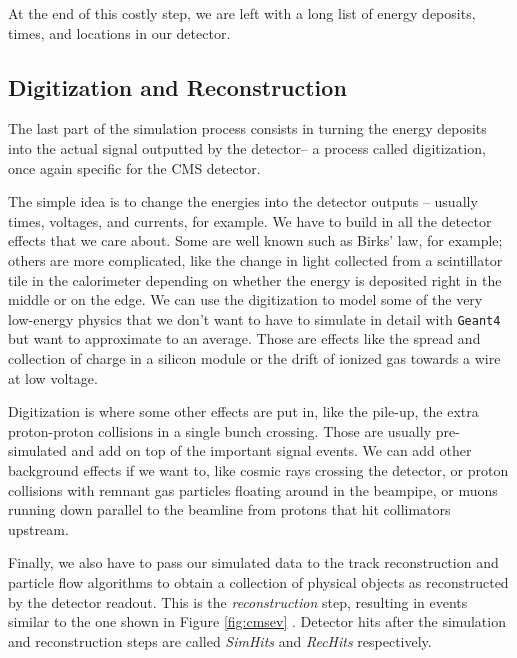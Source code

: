 At the end of this costly step, we are left with a long list of energy deposits, times, and locations in our detector. 

\subsection{Digitization and Reconstruction} 

The last part of the simulation process consists in turning the energy deposits into the actual signal outputted by the detector-- a process called digitization, once again specific for the CMS detector.

The simple idea is to change the energies into the detector outputs – usually times, voltages, and currents, for example. We have to build in all the detector effects that we care about. Some are well known such as Birks’ law, for example; others are more complicated, like the change in light collected from a scintillator tile in the calorimeter depending on whether the energy is deposited right in the middle or on the edge. We can use the digitization to model some of the very low-energy physics that we don’t want to have to simulate in detail with \texttt{Geant4} but want to approximate to an average. Those are effects like the spread and collection of charge in a silicon module or the drift of ionized gas towards a wire at low voltage.

Digitization is where some other effects are put in, like the pile-up, the extra proton-proton collisions in a single bunch crossing. Those are usually pre-simulated and add on top of the important signal events. We can add other background effects if we want to, like cosmic rays crossing the detector, or proton collisions with remnant gas particles floating around in the beampipe, or muons running down parallel to the beamline from protons that hit collimators upstream. 

Finally, we also have to pass our simulated data to the track reconstruction and particle flow algorithms to obtain a collection of physical objects as reconstructed by the detector readout. This is the \emph{reconstruction} step, resulting in events similar to the one shown in Figure \ref{fig:cmsev} . Detector hits after the simulation and reconstruction steps are called \emph{SimHits}
and \emph{RecHits} respectively.

